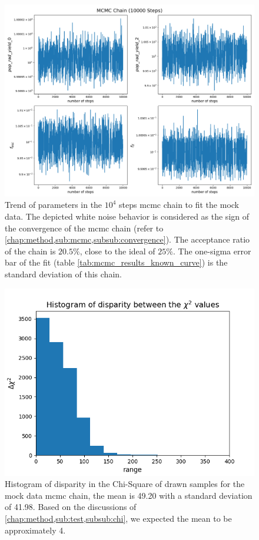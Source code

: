 \documentclass[12pt, TexShade, letterpaper]{report}
\begin{document}
\begin{figure}[h!]
\centering
\includegraphics[scale =0.5]{chain_known_curve.png}
\caption[Trend of parameters in the mock data \gls{mcmc} chain]{Trend of parameters in the $10^4$ steps \gls{mcmc} chain to fit the mock data. The depicted white noise behavior is considered as the sign of the convergence of the \gls{mcmc} chain (refer to \ref{chap:method,sub:mcmc,subsub:convergence}). The acceptance ratio of the chain is $20.5\%$, close to the ideal of $25\%$. The one-sigma error bar of the fit (table \ref{tab:mcmc_results_known_curve}) is the standard deviation of this chain.}
\label{fig:chain_known_curve}
\end{figure}

\begin{figure}[h!]
\centering
\includegraphics[scale =0.7]{csq_hist_known_curve.png}
\caption[Histogram of disparity in the chi-square of drawn samples for the mock data \gls{mcmc} chain]{Histogram of disparity in the Chi-Square of drawn samples for the mock data \gls{mcmc} chain, the mean is 49.20 with a standard deviation of 41.98. Based on the discussions of \ref{chap:method,sub:test,subsub:chi}, we expected the mean to be approximately 4.}
\label{fig:csq_hist_known_curve}
\end{figure}
\end{document}
